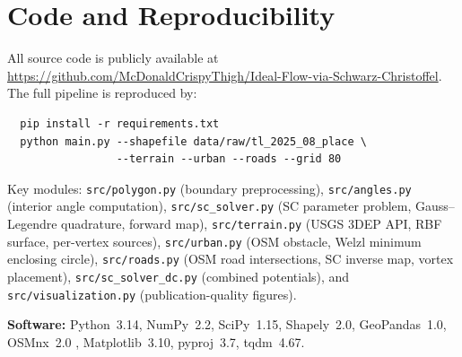 \documentclass[11pt]{article}
\begin{document}
\section{Code and Reproducibility}
\label{app:code}

All source code is publicly available at
\url{https://github.com/McDonaldCrispyThigh/Ideal-Flow-via-Schwarz-Christoffel}.
The full pipeline is reproduced by:
\begin{verbatim}
  pip install -r requirements.txt
  python main.py --shapefile data/raw/tl_2025_08_place \
                 --terrain --urban --roads --grid 80
\end{verbatim}
Key modules: \texttt{src/polygon.py} (boundary preprocessing),
\texttt{src/angles.py} (interior angle computation),
\texttt{src/sc\_solver.py} (SC parameter problem, Gauss--Legendre quadrature,
forward map),
\texttt{src/terrain.py} (USGS 3DEP API, RBF surface, per-vertex sources),
\texttt{src/urban.py} (OSM obstacle, Welzl minimum enclosing circle),
\texttt{src/roads.py} (OSM road intersections, SC inverse map, vortex placement),
\texttt{src/sc\_solver\_dc.py} (combined potentials), and
\texttt{src/visualization.py} (publication-quality figures).

\noindent\textbf{Software:} Python~3.14, NumPy~2.2, SciPy~1.15,
Shapely~2.0, GeoPandas~1.0, OSMnx~2.0 \citep{BG17}, Matplotlib~3.10,
pyproj~3.7, tqdm~4.67.
\end{document}
